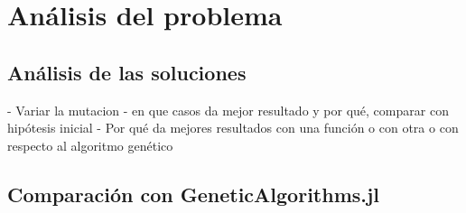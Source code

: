 \chapter{Análisis del problema}







\section{Análisis de las soluciones}

- Variar la mutacion
- en que casos da mejor resultado y por qué, comparar con hipótesis inicial
- Por qué da mejores resultados con una función o con otra o con respecto al algoritmo genético


\section{Comparación con GeneticAlgorithms.jl}
